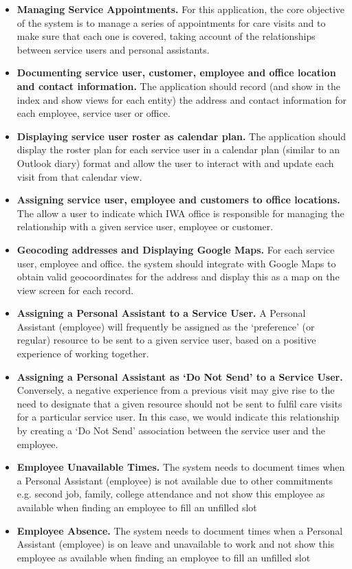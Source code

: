\documentclass[a4paper,Times New Roman 11pt]{article}
\begin{document}
\begin{samepage}
\begin{itemize}
\item \textbf {Managing Service Appointments.} For this application, the core objective of the system is to manage a series of appointments for care visits and to make sure that each one is covered, taking account of the relationships between service users and personal assistants.
\item \textbf {Documenting service user, customer, employee and office location and contact information.} The application should record (and show in the index and show views for each entity) the address and contact information for each employee, service user or office.
\item \textbf {Displaying service user roster as calendar plan.} The application should display the roster plan for each service user in a calendar plan (similar to an Outlook diary) format and allow the user to interact with and update each visit from that calendar view.
\item \textbf {Assigning service user, employee and customers to office locations.} The allow a user to indicate which IWA office is responsible for managing the relationship with a given service user, employee or customer.
\item \textbf {Geocoding addresses and Displaying Google Maps.} For each service user, employee and office. the system should integrate with Google Maps to obtain valid geocoordinates for the address and display this as a map on the view screen for each record.
\item \textbf{Assigning a Personal Assistant to a Service User.} A Personal Assistant (employee) will frequently be assigned as the `preference' (or regular) resource to be sent to a given service user, based on a positive experience of working together. 
\item \textbf{Assigning a Personal Assistant as `Do Not Send' to a Service User.} Conversely, a negative experience from a previous visit may give rise to the need to designate that a given resource should not be sent to fulfil care visits for a particular service user. In this case, we would indicate this relationship by creating a `Do Not Send' association between the service user and the employee.
\item \textbf{Employee Unavailable Times.} The system needs to document times when a  Personal Assistant (employee) is not available due to other commitments e.g. second job, family, college attendance and not show this employee as available when finding an employee to fill an unfilled slot 
\newpage
\item \textbf{Employee Absence.} The system needs to document times when a  Personal Assistant (employee) is on leave and unavailable to work and not show this employee as available when finding an employee to fill an unfilled slot 

\end{itemize}
\end{samepage}
\end{document}
